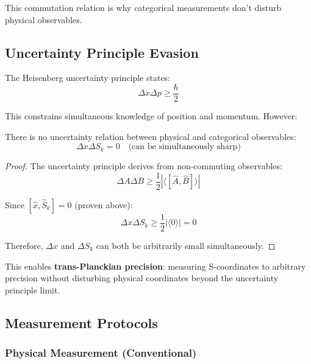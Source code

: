 This commutation relation is why categorical measurements don't disturb physical observables.

\subsection{Uncertainty Principle Evasion}

The Heisenberg uncertainty principle states:
\begin{equation}
\Delta x \Delta p \geq \frac{\hbar}{2}
\end{equation}

This constrains simultaneous knowledge of position and momentum. However:

\begin{theorem}
There is no uncertainty relation between physical and categorical observables:
\begin{equation}
\Delta x \Delta S_k = 0 \quad \text{(can be simultaneously sharp)}
\end{equation}
\end{theorem}

\begin{proof}
The uncertainty principle derives from non-commuting observables:
\begin{equation}
\Delta A \Delta B \geq \frac{1}{2}|\langle[\hat{A}, \hat{B}]\rangle|
\end{equation}

Since $[\hat{x}, \hat{S}_k] = 0$ (proven above):
\begin{equation}
\Delta x \Delta S_k \geq \frac{1}{2}|\langle 0 \rangle| = 0
\end{equation}

Therefore, $\Delta x$ and $\Delta S_k$ can both be arbitrarily small simultaneously.
\end{proof}

This enables \textbf{trans-Planckian precision}: measuring S-coordinates to arbitrary precision without disturbing physical coordinates beyond the uncertainty principle limit.

\subsection{Measurement Protocols}

\subsubsection{Physical Measurement (Conventional)}

